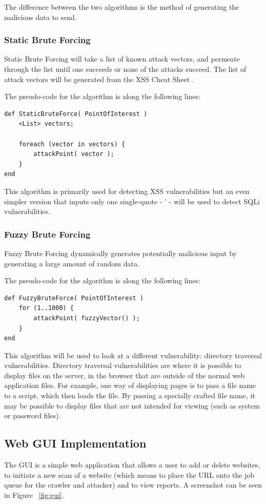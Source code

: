 \documentclass[12pt,a4paper]{article}
\begin{document}
The difference between the two algorithms is the method of generating the malicious data to send.

\subsubsection{Static Brute Forcing}
Static Brute Forcing will take a list of known attack vectors, and permeate through the list until one succeeds or none of the attacks succeed.  The list of attack vectors will be generated from the XSS Cheat Sheet \cite{Hansen:2009:Online}.

The pseudo-code for the algorithm is along the following lines:

\begin{lstlisting}
def StaticBruteForce( PointOfInterest )     
    <List> vectors;
    
    foreach (vector in vectors) { 
        attackPoint( vector );
    }
end
\end{lstlisting}

This algorithm is primarily used for detecting XSS vulnerabilities but an even simpler version that inputs only one single-quote - ' - will be used to detect SQLi vulnerabilities.

\subsubsection{Fuzzy Brute Forcing}
Fuzzy Brute Forcing dynamically generates potentially malicious input by generating a large amount of random data. \cite{Sutton2007}

The pseudo-code for the algorithm is along the following lines:

\begin{lstlisting} 
def FuzzyBruteForce( PointOfInterest )
	for (1..1000) { 		
	    attackPoint( fuzzyVector() ); 	
	}
end
\end{lstlisting}
This algorithm will be used to look at a different vulnerability: directory traversal vulnerabilities. Directory traversal vulnerabilities are where it is possible to display files on the server, in the browser that are outside of the normal web application files.  For example, one way of displaying pages is to pass a file name to a script, which then loads the file.  By passing a specially crafted file name, it may be possible to display files that are not intended for viewing (such as system or password files). %

\subsection{Web GUI Implementation}
The GUI is a simple web application that allows a user to add or delete websites, to initiate a new scan of a website (which means to place the URL onto the job queue for the crawler and attacker) and to view reports.  A screenshot can be seen in Figure ~\ref{fig:gui}.
\end{document}

